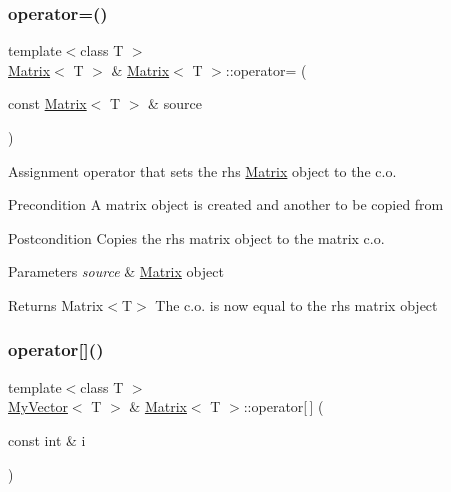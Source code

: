 \subsubsection{\texorpdfstring{operator=()}{operator=()}}
{\footnotesize\ttfamily template$<$class T $>$ \\
\mbox{\hyperlink{class_matrix}{Matrix}}$<$ T $>$ \& \mbox{\hyperlink{class_matrix}{Matrix}}$<$ T $>$\+::operator= (\begin{DoxyParamCaption}\item[{const \mbox{\hyperlink{class_matrix}{Matrix}}$<$ T $>$ \&}]{source }\end{DoxyParamCaption})}



Assignment operator that sets the rhs \mbox{\hyperlink{class_matrix}{Matrix}} object to the c.\+o. 

\begin{DoxyPrecond}{Precondition}
A matrix object is created and another to be copied from 
\end{DoxyPrecond}
\begin{DoxyPostcond}{Postcondition}
Copies the rhs matrix object to the matrix c.\+o. 
\end{DoxyPostcond}

\begin{DoxyParams}{Parameters}
{\em source} & \mbox{\hyperlink{class_matrix}{Matrix}} object \\
\hline
\end{DoxyParams}
\begin{DoxyReturn}{Returns}
Matrix$<$\+T$>$ The c.\+o. is now equal to the rhs matrix object 
\end{DoxyReturn}
\mbox{\label{class_matrix_aa9532c87a69bef256954e2309ca3fdd6}} 
\subsubsection{\texorpdfstring{operator[]()}{operator[]()}\hspace{0.1cm}{\footnotesize\ttfamily [1/2]}}
{\footnotesize\ttfamily template$<$class T $>$ \\
\mbox{\hyperlink{class_my_vector}{My\+Vector}}$<$ T $>$ \& \mbox{\hyperlink{class_matrix}{Matrix}}$<$ T $>$\+::operator\mbox{[}$\,$\mbox{]} (\begin{DoxyParamCaption}\item[{const int \&}]{i }\end{DoxyParamCaption})}



